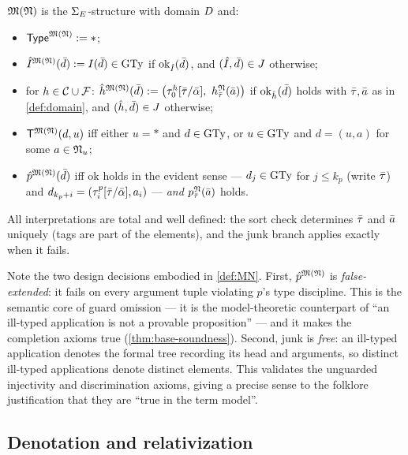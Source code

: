 \begin{definition}
  \label{def:MN}
  $\mathfrak{M}(\mathfrak{N})$ is the $\Sigma_{E}$-structure with domain $D$ and:
  \begin{itemize}
  \item $\mathsf{Type}^{\mathfrak{M}(\mathfrak{N})} \mathrel{:=} \ast$;
  \item $\hat I^{\mathfrak{M}(\mathfrak{N})}(\bar{d}) \mathrel{:=} I(\bar{d}) \in \mathrm{GTy}$ if
    $\mathrm{ok}_{\hat I}(\bar{d})$, and $(\hat I, \bar{d}) \in J$
    otherwise;
  \item for $h \in \mathcal{C} \cup \mathcal{F}$:
    $\hat h^{\mathfrak{M}(\mathfrak{N})}(\bar{d}) \mathrel{:=}
    \bigl(\tau^h_0[\bar{\tau}/\bar{\alpha}],\
    h_{\bar{\tau}}^{\mathfrak{N}}(\bar{a})\bigr)$ if $\mathrm{ok}_{\hat h}(\bar{d})$
    holds with $\bar{\tau}, \bar{a}$ as in \cref{def:domain}, and
    $(\hat h, \bar{d}) \in J$ otherwise;
  \item $\mathsf{T}^{\mathfrak{M}(\mathfrak{N})}(d, u)$ iff either $u = \ast$ and $d \in \mathrm{GTy}$, or
    $u \in \mathrm{GTy}$ and $d = (u, a)$ for some $a \in \mathfrak{N}_u$;
  \item $\hat p^{\mathfrak{M}(\mathfrak{N})}(\bar{d})$ iff $\mathrm{ok}$ holds in the evident
    sense --- $d_j \in \mathrm{GTy}$ for $j \le k_p$ (write $\bar{\tau}$) and
    $d_{k_p+i} = (\tau^p_i[\bar{\tau}/\bar{\alpha}], a_i)$ --- \emph{and}
    $p^{\mathfrak{N}}_{\bar{\tau}}(\bar{a})$ holds.
  \end{itemize}
  All interpretations are total and well defined: the sort check determines
  $\bar{\tau}$ and $\bar{a}$ uniquely (tags are part of the elements), and the
  junk branch applies exactly when it fails.
\end{definition}

Note the two design decisions embodied in \cref{def:MN}.  First,
$\hat p^{\mathfrak{M}(\mathfrak{N})}$ is \emph{false-extended}: it fails on every argument tuple
violating $p$'s type discipline.  This is the semantic core of guard
omission --- it is the model-theoretic counterpart of ``an ill-typed
application is not a provable proposition'' --- and it makes the completion
axioms true (\cref{thm:base-soundness}).  Second, junk is \emph{free}: an
ill-typed application denotes the formal tree recording its head and
arguments, so distinct ill-typed applications denote distinct elements.
This validates the unguarded injectivity and discrimination axioms, giving
a precise sense to the folklore justification that they are ``true in the
term model''.

\subsection{Denotation and relativization}

